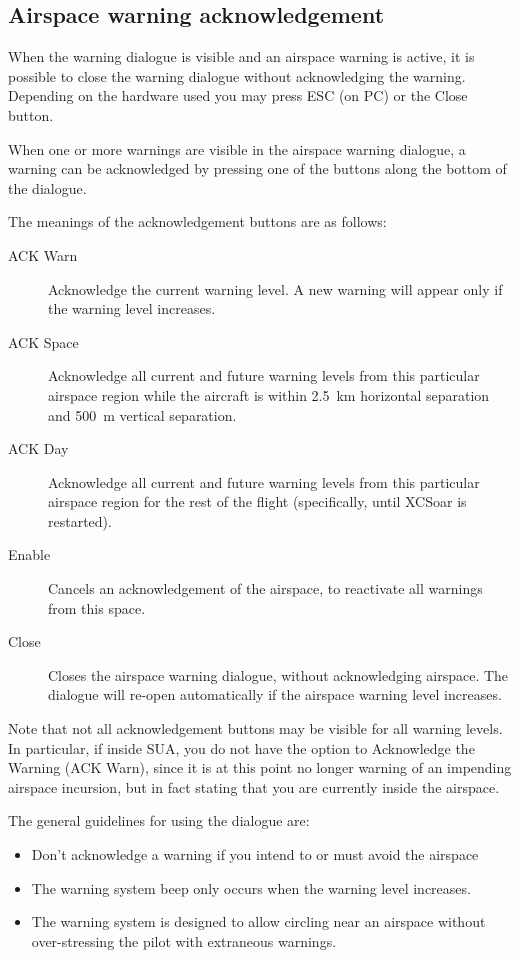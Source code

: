 \subsection*{Airspace warning acknowledgement}

When the warning dialogue is visible and an airspace warning is
active, it is possible to close the warning dialogue without acknowledging the warning.
Depending on the hardware used you may press ESC (on PC) or the Close button.

When one or more warnings are visible in the airspace warning dialogue,
a warning can be acknowledged by pressing one of the buttons along the bottom
of the dialogue.

The meanings of the acknowledgement buttons are as follows:
\begin{description}
\item[ACK Warn]  Acknowledge the current warning level.  A new warning will appear
only if the warning level increases.
\item[ACK Space]  Acknowledge all current and future warning levels from this 
particular airspace region while the aircraft is within 2.5~km horizontal separation
and 500~m vertical separation.
\item[ACK Day]  Acknowledge all current and future warning levels from this particular
airspace region for the rest of the flight (specifically, until XCSoar
is restarted).
\item[Enable]  Cancels an acknowledgement of the airspace, to reactivate all warnings
from this space.
\item[Close] Closes the airspace warning dialogue, without acknowledging airspace.
  The dialogue will re-open automatically if the airspace warning level increases.
\end{description}

Note that not all acknowledgement buttons may be visible for all
warning levels.  In particular, if inside SUA, you do not have the
option to Acknowledge the Warning (ACK Warn), since it is at this
point no longer warning of an impending airspace incursion, but in
fact stating that you are currently inside the airspace.

The general guidelines for using the dialogue are:
\begin{itemize}
\item  Don't acknowledge a warning if you intend to or must avoid the airspace
\item  The warning system beep only occurs when the warning level increases.
\item  The warning system is designed to allow circling near an airspace without
  over-stressing the pilot with extraneous warnings.
\end{itemize}

